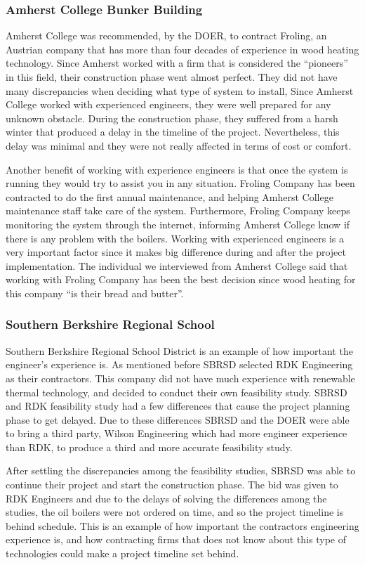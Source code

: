 \subsubsection{Amherst College Bunker Building}
\par Amherst College was recommended, by the DOER, to contract Froling, an Austrian company that has more than four decades of experience in wood heating technology. Since Amherst worked with a firm that is considered the “pioneers” in this field, their construction phase went almost perfect. They did not have many discrepancies when deciding what type of system to install, Since Amherst College worked with experienced engineers, they were well prepared for any unknown obstacle. During the construction phase, they suffered from a harsh winter that produced a delay in the timeline of the project. Nevertheless, this delay was minimal and they were not really affected in terms of cost or comfort.
\par Another benefit of working with experience engineers is that once the system is running they would try to assist you in any situation. Froling Company has been contracted to do the first annual maintenance, and helping Amherst College maintenance staff take care of the system. Furthermore, Froling Company keeps monitoring the system through the internet, informing Amherst College know if there is any problem with the boilers. Working with experienced engineers is a very important factor since it makes big difference during and after the project implementation. The individual we interviewed from Amherst College said that working with Froling Company has been the best decision since wood heating for this company “is their bread and butter”.

\subsubsection{Southern Berkshire Regional School}
\par Southern Berkshire Regional School District is an example of how important the engineer's experience is. As mentioned before SBRSD selected RDK Engineering as their contractors. This company did not have much experience with renewable thermal technology, and decided to conduct their own feasibility study. SBRSD and RDK feasibility study had a few differences that cause the project planning phase to get delayed. Due to these differences SBRSD and the DOER were able to bring a third party, Wilson Engineering which had more engineer experience than RDK, to produce a third and more accurate feasibility study.
\par After settling the discrepancies among the feasibility studies, SBRSD was able to continue their project and start the construction phase. The bid was given to RDK Engineers and due to the delays of solving the differences among the studies, the oil boilers were not ordered on time, and so the project timeline is behind schedule. This is an example of how important the contractors engineering experience is, and how contracting firms that does not know about this type of technologies could make a project timeline set behind.

